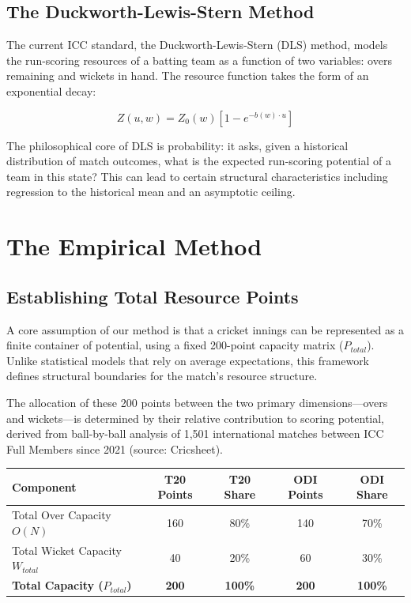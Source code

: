 \documentclass[12pt, letterpaper, fleqn]{article}
\begin{document}
\subsection{The Duckworth-Lewis-Stern Method}

\indent The current ICC standard, the Duckworth-Lewis-Stern (DLS) method, models the run-scoring resources of a batting team as a function of two variables: overs remaining and wickets in hand. The resource function takes the form of an exponential decay:

\begin{equation}
Z(u, w) = Z_0(w) \left[ 1 - e^{-b(w) \cdot u} \right]
\end{equation}

\indent The philosophical core of DLS is probability: it asks, given a historical distribution of match outcomes, what is the expected run-scoring potential of a team in this state? This can lead to certain structural characteristics including regression to the historical mean and an asymptotic ceiling.

\section{The Empirical Method}

\subsection{Establishing Total Resource Points}

\indent A core assumption of our method is that a cricket innings can be represented as a finite container of potential, using a fixed 200-point capacity matrix ($P_{total}$). Unlike statistical models that rely on average expectations, this framework defines structural boundaries for the match's resource structure. 

\indent The allocation of these 200 points between the two primary dimensions---overs and wickets---is determined by their relative contribution to scoring potential, derived from ball-by-ball analysis of 1,501 international matches between ICC Full Members since 2021 (source: Cricsheet).

\begin{center}
\renewcommand{\arraystretch}{1.5}
\begin{tabular}{|l|c|c|c|c|}
\hline
\textbf{Component} & \textbf{T20 Points} & \textbf{T20 Share} & \textbf{ODI Points} & \textbf{ODI Share} \\
\hline
Total Over Capacity $O(N)$ & 160 & 80\% & 140 & 70\% \\
\hline
Total Wicket Capacity $W_{total}$ & 40 & 20\% & 60 & 30\% \\
\hline
\textbf{Total Capacity ($P_{total}$)} & \textbf{200} & \textbf{100\%} & \textbf{200} & \textbf{100\%} \\
\hline
\end{tabular}
\end{center}
\end{document}
